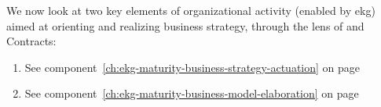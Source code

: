 We now look at two key elements of organizational activity (enabled by \gls{ekg}) aimed at orienting and
realizing business strategy, through the lens of 
and Contracts:

\begin{enumerate}
    \item 

    See component~\ref{ch:ekg-maturity-business-strategy-actuation} 
    on page \pageref{ch:ekg-maturity-business-strategy-actuation}

    \item 

    See component~\ref{ch:ekg-maturity-business-model-elaboration} 
    on page \pageref{ch:ekg-maturity-business-model-elaboration}
\end{enumerate}
